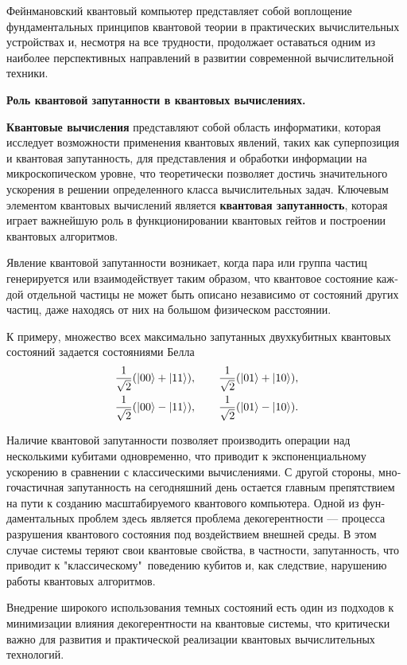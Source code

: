 Фейнмановский квантовый компьютер представляет собой воплощение фундаментальных принципов квантовой теории в практических вычислитель­ных устройствах и, несмотря на все трудности, продолжает оставаться одним из наиболее перспективных направлений в развитии современной вычислитель­ной техники.

\clearpage
\indent\textbf{Роль квантовой запутанности в квантовых вычислениях.}

\textbf{Квантовые вычисления} представляют собой область информатики, которая исследует возможности применения квантовых явлений, таких как суперпозиция и квантовая запутанность, для представления и обработки ин­формации на микроскопическом уровне, что теоретически позволяет достичь значительного ускорения в решении определенного класса вычислительных задач. Ключевым элементом квантовых вычислений является \textbf{квантовая за­путанность}, которая играет важнейшую роль в функционировании квантовых гейтов и построении квантовых алгоритмов.

Явление квантовой запутанности возникает, когда пара или группа частиц генерируется или взаимодействует таким образом, что квантовое состояние каж­дой отдельной частицы не может быть описано независимо от состояний других частиц, даже находясь от них на большом физическом расстоянии.

К примеру, множество всех максимально запутанных двухкубитных кван­товых состояний задается состояниями Белла
\begin{align*}
	\frac{1}{\sqrt{2}}(|00\rangle + |11\rangle),\qquad \frac{1}{\sqrt{2}}(|01\rangle + |10\rangle),\\
	\frac{1}{\sqrt{2}}(|00\rangle - |11\rangle),\qquad \frac{1}{\sqrt{2}}(|01\rangle - |10\rangle).
\end{align*}

Наличие квантовой запутанности позволяет производить операции над несколькими кубитами одновременно, что приводит к экспоненциальному ускорению в сравнении с классическими вычислениями. С другой стороны, мно­гочастичная запутанность на сегодняшний день остается главным препятствием на пути к созданию масштабируемого квантового компьютера. Одной из фун­даментальных проблем здесь является проблема декогерентности --- процесса разрушения квантового состояния под воздействием внешней среды. В этом случае системы теряют свои квантовые свойства, в частности, запутанность, что приводит к "классическому"\ поведению кубитов и, как следствие, наруше­нию работы квантовых алгоритмов.

Внедрение широкого использования темных состояний есть один из под­ходов к минимизации влияния декогерентности на квантовые системы, что критически важно для развития и практической реализации квантовых вычислительных технологий.


